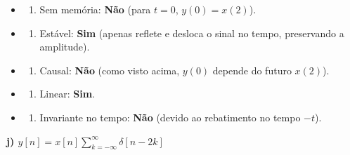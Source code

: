 \begin{itemize}
\tightlist
\item
  \begin{enumerate}
  \def\labelenumi{(\roman{enumi})}
  \tightlist
  \item
    Sem memória: \textbf{Não} (para \(t=0\), \(y(0)=x(2)\)).
  \end{enumerate}
\item
  \begin{enumerate}
  \def\labelenumi{(\roman{enumi})}
  \setcounter{enumi}{1}
  \tightlist
  \item
    Estável: \textbf{Sim} (apenas reflete e desloca o sinal no tempo, preservando a amplitude).
  \end{enumerate}
\item
  \begin{enumerate}
  \def\labelenumi{(\roman{enumi})}
  \setcounter{enumi}{2}
  \tightlist
  \item
    Causal: \textbf{Não} (como visto acima, \(y(0)\) depende do futuro \(x(2)\)).
  \end{enumerate}
\item
  \begin{enumerate}
  \def\labelenumi{(\roman{enumi})}
  \setcounter{enumi}{3}
  \tightlist
  \item
    Linear: \textbf{Sim}.
  \end{enumerate}
\item
  \begin{enumerate}
  \def\labelenumi{(\alph{enumi})}
  \setcounter{enumi}{21}
  \tightlist
  \item
    Invariante no tempo: \textbf{Não} (devido ao rebatimento no tempo \(-t\)).
  \end{enumerate}
\end{itemize}

\textbf{j) \(y[n] = x[n] \sum_{k=-\infty}^{\infty} \delta[n-2k]\)}

